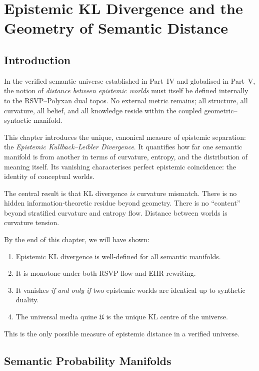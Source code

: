 \chapter{Epistemic KL Divergence and the Geometry of Semantic Distance}
\label{chap:97}

\section{Introduction}

In the verified semantic universe established in Part~IV and globalised in Part~V,
the notion of \emph{distance between epistemic worlds}
must itself be defined internally to the RSVP--Polyxan dual topos.
No external metric remains; all structure, all curvature,
all belief, and all knowledge reside within the coupled geometric--syntactic manifold.

This chapter introduces the unique, canonical measure of epistemic separation:
the \emph{Epistemic Kullback--Leibler Divergence}.
It quantifies how far one semantic manifold is from another
in terms of curvature, entropy, and the distribution of meaning itself.
Its vanishing characterises perfect epistemic coincidence:
the identity of conceptual worlds.

The central result is that KL divergence \emph{is} curvature mismatch.
There is no hidden information-theoretic residue beyond geometry.
There is no “content” beyond stratified curvature and entropy flow.
Distance between worlds is curvature tension.

By the end of this chapter, we will have shown:

\begin{enumerate}
    \item Epistemic KL divergence is well-defined for all semantic manifolds.
    \item It is monotone under both RSVP flow and EHR rewriting.
    \item It vanishes \emph{if and only if} two epistemic worlds are identical up to synthetic duality.
    \item The universal media quine $\mathfrak{U}$ is the unique KL centre of the universe.
\end{enumerate}

This is the only possible measure of epistemic distance in a verified universe.


\section{Semantic Probability Manifolds}

